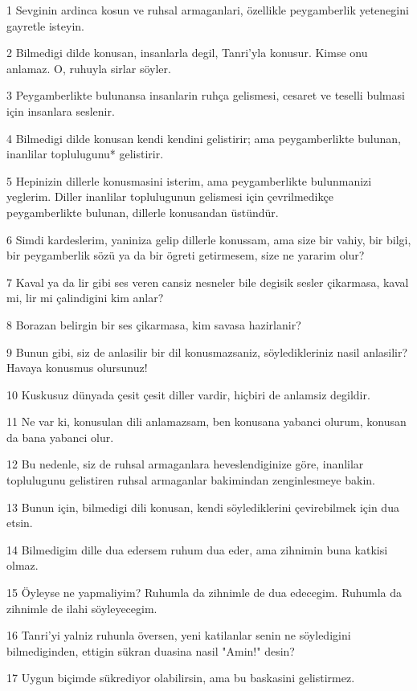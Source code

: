 \par 1 Sevginin ardinca kosun ve ruhsal armaganlari, özellikle peygamberlik yetenegini gayretle isteyin.
\par 2 Bilmedigi dilde konusan, insanlarla degil, Tanri'yla konusur. Kimse onu anlamaz. O, ruhuyla sirlar söyler.
\par 3 Peygamberlikte bulunansa insanlarin ruhça gelismesi, cesaret ve teselli bulmasi için insanlara seslenir.
\par 4 Bilmedigi dilde konusan kendi kendini gelistirir; ama peygamberlikte bulunan, inanlilar toplulugunu* gelistirir.
\par 5 Hepinizin dillerle konusmasini isterim, ama peygamberlikte bulunmanizi yeglerim. Diller inanlilar toplulugunun gelismesi için çevrilmedikçe peygamberlikte bulunan, dillerle konusandan üstündür.
\par 6 Simdi kardeslerim, yaniniza gelip dillerle konussam, ama size bir vahiy, bir bilgi, bir peygamberlik sözü ya da bir ögreti getirmesem, size ne yararim olur?
\par 7 Kaval ya da lir gibi ses veren cansiz nesneler bile degisik sesler çikarmasa, kaval mi, lir mi çalindigini kim anlar?
\par 8 Borazan belirgin bir ses çikarmasa, kim savasa hazirlanir?
\par 9 Bunun gibi, siz de anlasilir bir dil konusmazsaniz, söyledikleriniz nasil anlasilir? Havaya konusmus olursunuz!
\par 10 Kuskusuz dünyada çesit çesit diller vardir, hiçbiri de anlamsiz degildir.
\par 11 Ne var ki, konusulan dili anlamazsam, ben konusana yabanci olurum, konusan da bana yabanci olur.
\par 12 Bu nedenle, siz de ruhsal armaganlara heveslendiginize göre, inanlilar toplulugunu gelistiren ruhsal armaganlar bakimindan zenginlesmeye bakin.
\par 13 Bunun için, bilmedigi dili konusan, kendi söylediklerini çevirebilmek için dua etsin.
\par 14 Bilmedigim dille dua edersem ruhum dua eder, ama zihnimin buna katkisi olmaz.
\par 15 Öyleyse ne yapmaliyim? Ruhumla da zihnimle de dua edecegim. Ruhumla da zihnimle de ilahi söyleyecegim.
\par 16 Tanri'yi yalniz ruhunla översen, yeni katilanlar senin ne söyledigini bilmediginden, ettigin sükran duasina nasil "Amin!" desin?
\par 17 Uygun biçimde sükrediyor olabilirsin, ama bu baskasini gelistirmez.
